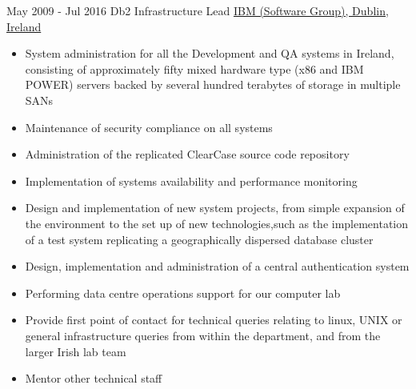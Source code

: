\documentclass[letterpaper]{tenseconds} %
\begin{document}
\begin{twenty}
{	}
	\twentyitem
	{May 2009 -}
	{Jul 2016}
	{Db2 Infrastructure Lead}
	{\href{https://www.ibm.com/db2}{IBM (Software Group), Dublin, Ireland}}
	{}
	{\begin{itemize}
		 \item System administration for all the Development and QA systems in Ireland, consisting of approximately fifty mixed hardware type (x86 and IBM POWER) servers backed by several hundred terabytes of storage in multiple SANs
		 \item Maintenance of security compliance on all systems%
		 \item Administration of the replicated ClearCase source code repository%
		 \item Implementation of systems availability and performance monitoring
		 \item Design and implementation of new system projects, from simple expansion of the environment to the set up of new technologies,such as the implementation of a test system replicating a geographically dispersed database cluster
		 \item Design, implementation and administration of a central authentication system%
		 \item Performing data centre operations support for our computer lab%
		 \item Provide first point of contact for technical queries relating to linux, UNIX or general infrastructure queries from within the department, and from the larger Irish lab team
		 \item Mentor other technical staff
	\end{itemize}}
\end{twenty}
\end{document}
